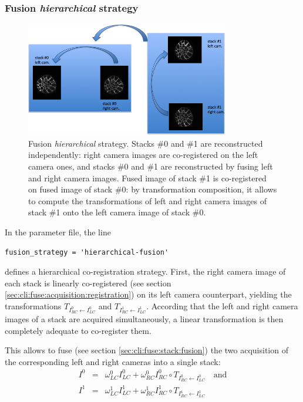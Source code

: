 \subsubsection{Fusion \textit{hierarchical} strategy}

\begin{figure}
\begin{center}
\includegraphics[height=50mm]{figures/fusion-hierarchical-strategy.png}  
\end{center}
\caption{\label{fig:cli:fuse:hierarchical:strategy} Fusion \textit{hierarchical} strategy. Stacks \#0 and \#1 are reconstructed independently: right camera images are co-registered on the left camera ones, and stacks \#0 and \#1 are reconstructed by fusing left and right camera images. Fused image of stack \#1 is co-registered on fused image of stack \#0: by transformation composition, it allows to compute the transformations of left and right camera images of stack \#1 onto the left camera image of stack \#0.}
\end{figure}

In the parameter file, the line
\begin{verbatim}
fusion_strategy = 'hierarchical-fusion'
\end{verbatim}
defines a hierarchical  co-registration  strategy. First, the right camera image of each stack is linearly co-registered (see section \ref{sec:cli:fuse:acquisition:registration}) on its left camera counterpart, yielding the transformations
$T_{I^{0}_{RC} \leftarrow I^{0}_{LC}}$ and
$T_{I^{1}_{RC} \leftarrow I^{1}_{LC}}$.
According that the left and right camera images of a stack are acquired simultaneously, a linear transformation is then completely adequate to co-register them.

This allows to fuse (see section \ref{sec:cli:fuse:stack:fusion}) the two acquisition of the corresponding left and right cameras into a single stack:
\begin{eqnarray*}
I^{0} & = & \omega^{0}_{LC} I^{0}_{LC} 
          + \omega^{0}_{RC} I^{0}_{RC} \circ T_{I^{0}_{RC} \leftarrow I^{0}_{LC}} \quad \textrm{and} \\
I^{1} & = & \omega^{1}_{LC} I^{1}_{LC} 
          + \omega^{1}_{RC} I^{1}_{RC} \circ T_{I^{1}_{RC} \leftarrow I^{1}_{LC}}                         
\end{eqnarray*}

